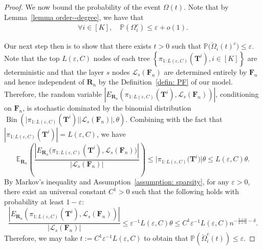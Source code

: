 \documentclass[twoside,11pt]{article}
\theoremstyle{remark}
\begin{document}
\begin{proof}
We now bound the probability of the event $\Omega(t)$. Note that by Lemma~\ref{lemma order--degree}, we have that 
\begin{align}
\forall i \in [K], \quad \mathbb{P}\left(\Omega^c_i\right)\le \varepsilon+o(1). \label{eq:omega_i_prob_bound}
\end{align}

Our next step then is to show that there exists $t > 0$ such that $\mathbb{P}\bigl(\breve{\Omega}_i(t)^c\bigr) \leq \varepsilon$. Note that the top $L(\varepsilon, C)$ nodes of each tree $\left\{\pi_{1:{L\left(\varepsilon, C\right)}}\left(\boldsymbol{T}^i\right), i \in \left[K\right]\right\}$ are deterministic and that the layer $s$ nodes $\mathcal{L}_s\left(\boldsymbol{F}_n\right)$
are determined entirely by $\bm{F}_n$ and hence independent of $\boldsymbol{R}_n$ by the Definition~\ref{defin: PF} of our model. Therefore, the random variable $|E_{\bm{R}_n}(\pi_{1:L(\varepsilon,C)}(\bm{T}^i), \mathcal{L}_s(\bm{F}_n))|$, conditioning on $\boldsymbol{F}_n$, is stochastic dominated by the binomial distribution $\operatorname{Bin} \left(\bigl|\pi_{1:{L(\varepsilon, C)}}\left(\boldsymbol{T}^i\right)\bigr| \left|\mathcal{L}_s\left(\boldsymbol{F}_n\right)\right|, \theta \right)$.
Combining with the fact that $\left|\pi_{1:{L\left(\varepsilon, C\right)}}\left(\boldsymbol{T}^i\right)\right|=L\left(\varepsilon, C\right)$, we have
%
\begingroup
\begin{equation*}    \mathbb{E}_{\bm{R}_n}\left(\frac{\left|E_{\boldsymbol{R}_n}\bigl(\pi_{1:{L\left(\varepsilon, C\right)}}\left(\boldsymbol{T}^i\right), \mathcal{L}_s\left(\boldsymbol{F}_n\right)\bigr)\right|}{\left| \mathcal{L}_s\left(\boldsymbol{F}_n\right)\right|}\right)
\le \bigl|\pi_{1:{L\left(\varepsilon, C\right)}}\bigl(\boldsymbol{T}^i\bigr)\bigr| \theta
\le L\left(\varepsilon, C\right)\theta.
\end{equation*}
\endgroup
%
By Markov's inequality and Assumption~\ref{assumption: sparsity}, for any $\varepsilon>0$, there exist an universal constant $C^1>0$ such that the following holds with probability at least $1-\varepsilon$:
%
\begin{equation*}   \frac{\left|E_{\boldsymbol{R}_n}\left(\pi_{1:{L\left(\varepsilon, C\right)}}\left(\boldsymbol{T}^i\right), \mathcal{L}_s\left(\boldsymbol{F}_n\right)\right)\right|}{\left| \mathcal{L}_s\left(\boldsymbol{F}_n\right)\right|}\le \varepsilon^{-1} L\left(\varepsilon, C\right)\theta\le  C^1\varepsilon^{-1} L\left(\varepsilon, C\right)n^{-\frac{1+\alpha}{2+\alpha}-\delta}. 
\end{equation*}
%
Therefore, we may take $t:=C^1\varepsilon^{-1} L\left(\varepsilon, C\right)$ to obtain that $\mathbb{P}\left(\breve{\Omega}^c_i\left(t\right)\right)\le \varepsilon$.


\end{proof}
\end{document}
